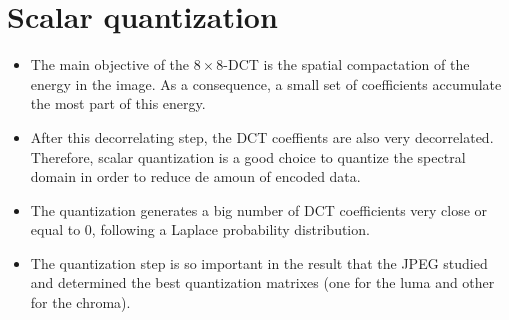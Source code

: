 \section{Scalar quantization}
\begin{itemize}
\item The main objective of the $8\times 8$-DCT is the spatial
  compactation of the energy in the image. As a consequence, a small
  set of coefficients accumulate the most part of this energy.
\item After this decorrelating step, the DCT coeffients are also very
  decorrelated. Therefore, scalar quantization is a good choice to
  quantize the spectral domain in order to reduce de amoun of encoded
  data.
\item The quantization generates a big number of DCT coefficients very
  close or equal to 0, following a Laplace probability distribution.
\newpage
\item The quantization step is so important in the result that the
  JPEG studied and determined the best quantization matrixes (one for
  the luma and other for the chroma).
\end{itemize}
  \begin{center}
  \end{center}
